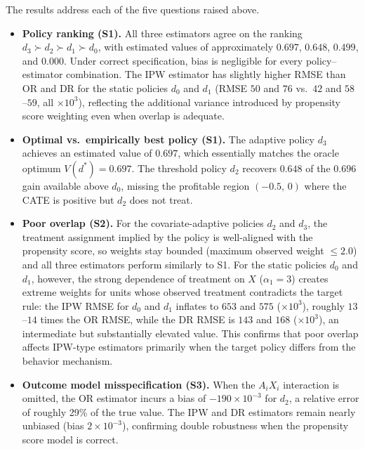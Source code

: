 \documentclass[master.tex]{subfiles}
\begin{document}
\noindent The results address each of the five questions raised above.

\begin{itemize}

  \item \textbf{Policy ranking (S1).}  All three estimators agree on
    the ranking $d_3 \succ d_2 \succ d_1 \succ d_0$, with estimated
    values of approximately $0.697$, $0.648$, $0.499$, and $0.000$.
    Under correct specification, bias is negligible for every
    policy--estimator combination.  The IPW estimator has slightly
    higher RMSE than OR and DR for the static policies $d_0$ and $d_1$
    (RMSE $50$ and $76$ vs.\ $42$ and $58$--$59$, all $\times 10^3$),
    reflecting the additional variance introduced by propensity score
    weighting even when overlap is adequate.

  \item \textbf{Optimal vs.\ empirically best policy (S1).}  The
    adaptive policy $d_3$ achieves an estimated value of $0.697$, which
    essentially matches the oracle optimum $V(d^*)=0.697$.  The
    threshold policy $d_2$ recovers $0.648$ of the $0.696$ gain
    available above $d_0$, missing the profitable region
    $(-0.5,\,0)$ where the CATE is positive but $d_2$ does not treat.

  \item \textbf{Poor overlap (S2).}  For the covariate-adaptive
    policies $d_2$ and $d_3$, the treatment assignment implied by the
    policy is well-aligned with the propensity score, so weights stay
    bounded (maximum observed weight $\leq 2.0$) and all three
    estimators perform similarly to S1.  For the static policies $d_0$
    and $d_1$, however, the strong dependence of treatment on $X$
    ($\alpha_1=3$) creates extreme weights for units whose observed
    treatment contradicts the target rule: the IPW RMSE for $d_0$ and
    $d_1$ inflates to $653$ and $575$ ($\times 10^3$), roughly
    $13$--$14$ times the OR RMSE, while the DR RMSE is $143$ and $168$
    ($\times 10^3$), an intermediate but substantially elevated value.
    This confirms that poor overlap affects IPW-type estimators
    primarily when the target policy differs from the behavior
    mechanism.

  \item \textbf{Outcome model misspecification (S3).}  When the
    $A_i X_i$ interaction is omitted, the OR estimator incurs a bias of
    $-190\times 10^{-3}$ for $d_2$, a relative error of roughly 29\%
    of the true value.  The IPW and DR estimators remain nearly
    unbiased (bias $2\times 10^{-3}$), confirming double robustness
    when the propensity score model is correct.


\end{itemize}
\end{document}
